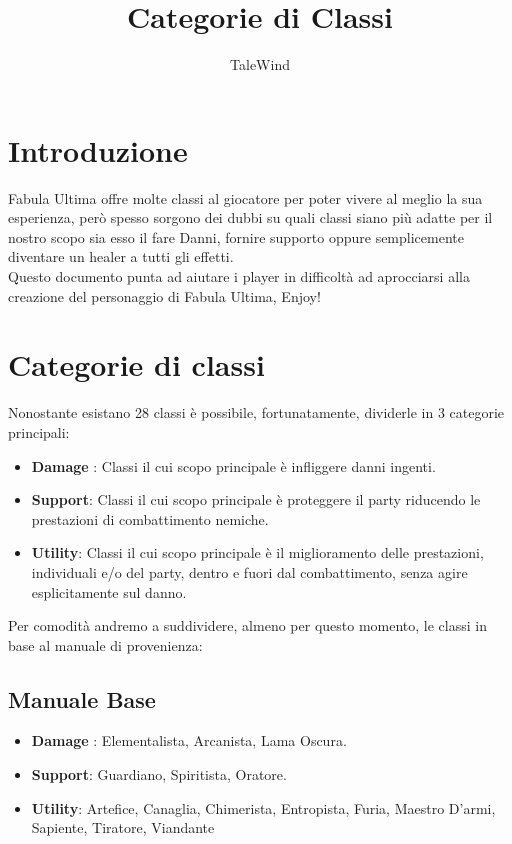 \documentclass{article}
\title{Categorie di Classi}
\author{TaleWind}
\begin{document}
\maketitle
\tableofcontents
\newpage
\section{Introduzione}
Fabula Ultima offre molte classi al giocatore per poter vivere al meglio la sua esperienza, però spesso sorgono dei dubbi su quali classi siano più adatte per il nostro scopo sia esso il fare Danni, fornire supporto oppure semplicemente diventare un healer a tutti gli effetti.\\
Questo documento punta ad aiutare i player in difficoltà ad aprocciarsi alla creazione del personaggio di Fabula Ultima, Enjoy!

\section{Categorie di classi}
Nonostante esistano 28 classi è possibile, fortunatamente, dividerle in 3 categorie principali:
\begin{itemize}
    \item \textbf{Damage} : Classi il cui scopo principale è infliggere danni ingenti.
    \item \textbf{Support}: Classi il cui scopo principale è proteggere il party riducendo le prestazioni di combattimento nemiche.
    \item \textbf{Utility}: Classi il cui scopo principale è il miglioramento delle prestazioni, individuali e/o del party, dentro e fuori dal combattimento, senza agire esplicitamente sul danno.
\end{itemize}
Per comodità andremo a suddividere, almeno per questo momento, le classi in base al manuale di provenienza:
\subsection{Manuale Base}
\begin{itemize}
    \item \textbf{Damage} : Elementalista, Arcanista, Lama Oscura.
    \item \textbf{Support}: Guardiano, Spiritista, Oratore.
    \item \textbf{Utility}: Artefice, Canaglia, Chimerista, Entropista, Furia, Maestro D'armi, Sapiente, Tiratore, Viandante
\end{itemize}
\end{document}
